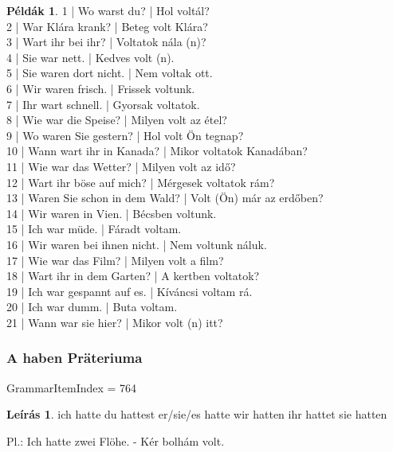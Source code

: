 \documentclass{article}
\theoremstyle{definition}
\newtheorem*{exmp}{Példák}
\newtheorem*{desc}{Leírás}
\begin{document}
\begin{exmp}
1 | Wo warst du? | Hol voltál?\\
2 | War Klára krank? | Beteg volt Klára?\\
3 | Wart ihr bei ihr? | Voltatok nála (n)?\\
4 | Sie war nett. | Kedves volt (n).\\
5 | Sie waren dort nicht. | Nem voltak ott.\\
6 | Wir waren frisch. | Frissek voltunk.\\
7 | Ihr wart schnell. | Gyorsak voltatok.\\
8 | Wie war die Speise? | Milyen volt az étel?\\
9 | Wo waren Sie gestern? | Hol volt Ön tegnap?\\
10 | Wann wart ihr in Kanada? | Mikor voltatok Kanadában?\\
11 | Wie war das Wetter? | Milyen volt az idő?\\
12 | Wart ihr böse auf mich? | Mérgesek voltatok rám?\\
13 | Waren Sie schon in dem Wald? | Volt (Ön) már az erdőben?\\
14 | Wir waren in Vien. | Bécsben voltunk.\\
15 | Ich war müde. | Fáradt voltam.\\
16 | Wir waren bei ihnen nicht. | Nem voltunk náluk.\\
17 | Wie war das Film? | Milyen volt a film?\\
18 | Wart ihr in dem Garten? | A kertben voltatok?\\
19 | Ich war gespannt auf es. | Kíváncsi voltam rá.\\
20 | Ich war dumm. | Buta voltam.\\
21 | Wann war sie hier? | Mikor volt (n) itt?\\
\end{exmp}

\subsubsection{A haben Präteriuma}

GrammarItemIndex = 764

\begin{desc}
ich hatte
du hattest
er/sie/es hatte
wir hatten
ihr hattet
sie hatten

Pl.: Ich hatte zwei Flöhe. - Kér bolhám volt.
\end{desc}
\end{document}
